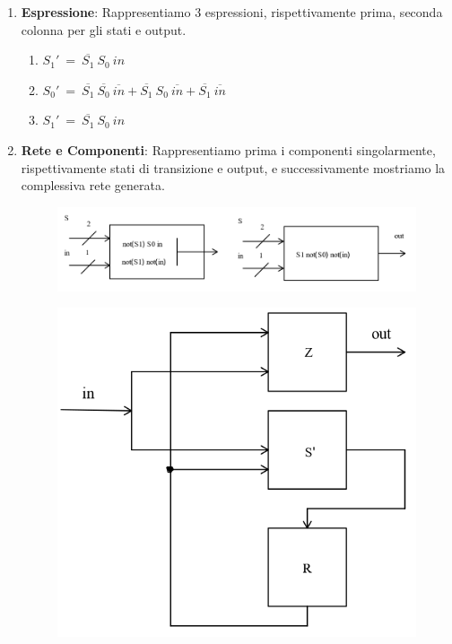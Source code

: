 \documentclass{article}
\begin{document}
\begin{enumerate}
     \item \textbf{Espressione}: Rappresentiamo $3$ espressioni, rispettivamente prima, seconda colonna per gli stati e output.

    \begin{enumerate}
        \item $S_{1}' \: = \: \overline{S_{1}}\:S_{0}\:in $
        \item $S_{0}' \: = \: \overline{S_{1}}\:\overline{S_{0}}\:\overline{in} + \overline{S_{1}}\:S_{0}\:\overline{in} + \overline{S_{1}}\:\overline{in}$
        \item $S_{1}' \: = \: \overline{S_{1}}\:S_{0}\:in $
    \end{enumerate}

    \item \textbf{Rete e Componenti}: Rappresentiamo prima i componenti singolarmente, rispettivamente stati di transizione e output, e successivamente mostriamo la complessiva rete generata.

    \begin{figure}[htbp]
        \includegraphics[scale=0.5]{img/rete1_automa1.png}
        \centering
    \end{figure}

    \begin{figure}[htbp]
        \includegraphics[scale=0.5]{img/rete2_automa1.png}
        \centering
    \end{figure}
    
\end{enumerate}
\end{document}
